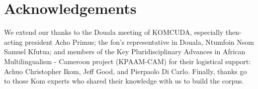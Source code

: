 \documentclass[output=paper,colorlinks,citecolor=brown
]{langscibook}
\begin{document}
%

\section*{Acknowledgements}

We extend our thanks to the Douala meeting of KOMCUDA, especially then-acting president Acho Primus; the fon's representative in Douala, Ntumfoin Nsom Samuel Kfutua; and members of the Key Pluridisciplinary Advances in African Multilingualism - Cameroon project (KPAAM-CAM) for their logistical support: Achuo Christopher Ikom, Jeff Good, and Pierpaolo Di Carlo. Finally, thanks go to those Kom experts who shared their knowledge with us to build the corpus. 

\sloppy %

\printbibliography[heading=subbibliography,notkeyword=this]
\end{document}
